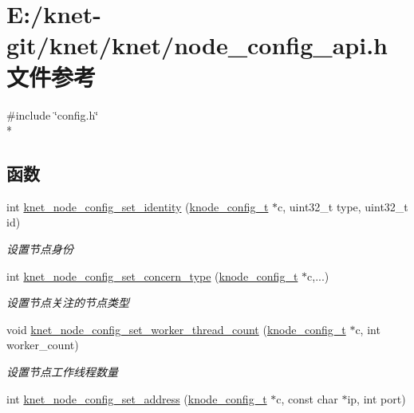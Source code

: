 \hypertarget{a00106}{}\section{E\+:/knet-\/git/knet/knet/node\+\_\+config\+\_\+api.h 文件参考}
\label{a00106}
{\ttfamily \#include \char`\"{}config.\+h\char`\"{}}\\*
\subsection*{函数}
\begin{DoxyCompactItemize}
\item 
int \hyperlink{a00106_af43c46c60f109257eea6dd1aee31d2f6_af43c46c60f109257eea6dd1aee31d2f6}{knet\+\_\+node\+\_\+config\+\_\+set\+\_\+identity} (\hyperlink{a00066_af1cfaee0eb1c76ebf06076b95cc47ee1_af1cfaee0eb1c76ebf06076b95cc47ee1}{knode\+\_\+config\+\_\+t} $\ast$c, uint32\+\_\+t type, uint32\+\_\+t id)
\begin{DoxyCompactList}\small\item\em 设置节点身份 \end{DoxyCompactList}\item 
int \hyperlink{a00106_ac0321d2cf804979fe145d2443f959dfb_ac0321d2cf804979fe145d2443f959dfb}{knet\+\_\+node\+\_\+config\+\_\+set\+\_\+concern\+\_\+type} (\hyperlink{a00066_af1cfaee0eb1c76ebf06076b95cc47ee1_af1cfaee0eb1c76ebf06076b95cc47ee1}{knode\+\_\+config\+\_\+t} $\ast$c,...)
\begin{DoxyCompactList}\small\item\em 设置节点关注的节点类型 \end{DoxyCompactList}\item 
void \hyperlink{a00106_a641862e4aa65a1f75e90b4b7385edf87_a641862e4aa65a1f75e90b4b7385edf87}{knet\+\_\+node\+\_\+config\+\_\+set\+\_\+worker\+\_\+thread\+\_\+count} (\hyperlink{a00066_af1cfaee0eb1c76ebf06076b95cc47ee1_af1cfaee0eb1c76ebf06076b95cc47ee1}{knode\+\_\+config\+\_\+t} $\ast$c, int worker\+\_\+count)
\begin{DoxyCompactList}\small\item\em 设置节点工作线程数量 \end{DoxyCompactList}\item 
int \hyperlink{a00106_a8ac0b513640cb0bfd4c919441731404d_a8ac0b513640cb0bfd4c919441731404d}{knet\+\_\+node\+\_\+config\+\_\+set\+\_\+address} (\hyperlink{a00066_af1cfaee0eb1c76ebf06076b95cc47ee1_af1cfaee0eb1c76ebf06076b95cc47ee1}{knode\+\_\+config\+\_\+t} $\ast$c, const char $\ast$ip, int port)

\end{DoxyCompactItemize}
